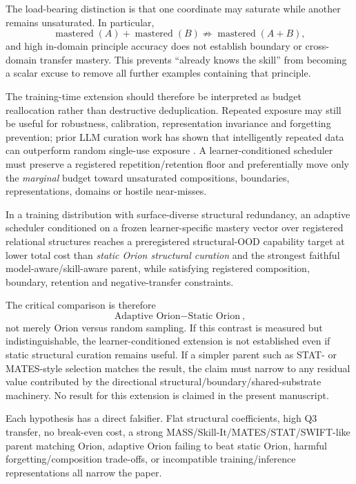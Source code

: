 The load-bearing distinction is that one coordinate may saturate while another remains unsaturated. In particular,
\[
\operatorname{mastered}(A)+\operatorname{mastered}(B)
\not\Rightarrow
\operatorname{mastered}(A+B),
\]
and high in-domain principle accuracy does not establish boundary or cross-domain transfer mastery. This prevents ``already knows the skill'' from becoming a scalar excuse to remove all further examples containing that principle.

The training-time extension should therefore be interpreted as budget reallocation rather than destructive deduplication. Repeated exposure may still be useful for robustness, calibration, representation invariance and forgetting prevention; prior LLM curation work has shown that intelligently repeated data can outperform random single-use exposure \cite{tirumala2023d4}. A learner-conditioned scheduler must preserve a registered repetition/retention floor and preferentially move only the \emph{marginal} budget toward unsaturated compositions, boundaries, representations, domains or hostile near-misses.

\begin{hypothesis}
In a training distribution with surface-diverse structural redundancy, an adaptive scheduler conditioned on a frozen learner-specific mastery vector over registered relational structures reaches a preregistered structural-OOD capability target at lower total cost than \emph{static Orion structural curation} and the strongest faithful model-aware/skill-aware parent, while satisfying registered composition, boundary, retention and negative-transfer constraints.
\end{hypothesis}

The critical comparison is therefore
\[
\boxed{\text{Adaptive Orion}-\text{Static Orion}},
\]
not merely Orion versus random sampling. If this contrast is measured but indistinguishable, the learner-conditioned extension is not established even if static structural curation remains useful. If a simpler parent such as STAT- or MATES-style selection matches the result, the claim must narrow to any residual value contributed by the directional structural/boundary/shared-substrate machinery. No result for this extension is claimed in the present manuscript.

Each hypothesis has a direct falsifier. Flat structural coefficients, high Q3 transfer, no break-even cost, a strong MASS/Skill-It/MATES/STAT/SWIFT-like parent matching Orion, adaptive Orion failing to beat static Orion, harmful forgetting/composition trade-offs, or incompatible training/inference representations all narrow the paper.
